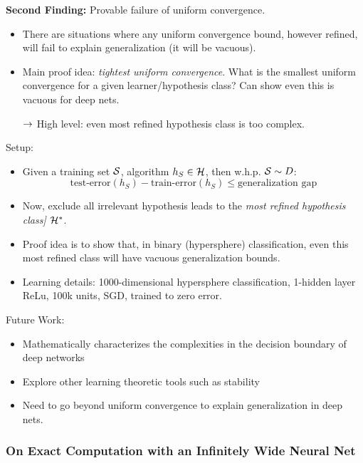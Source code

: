 {\bf Second Finding:} Provable failure of uniform convergence.
\begin{itemize}
    \item There are situations where any uniform convergence bound, however refined, will fail to explain generalization (it will be vacuous).
    \item Main proof idea: {\it tightest uniform convergence}. What is the smallest uniform convergence for a given learner/hypothesis class? Can show even this is vacuous for deep nets.
    
    $\rightarrow$ High level: even most refined hypothesis class is too complex.
\end{itemize}

Setup:
\begin{itemize}
    \item Given a training set $\mathcal{S}$, algorithm $h_S \in \mathcal{H}$, then w.h.p. $\mathcal{S} \sim D$:
    \[
    \text{test-error}(h_S) - \text{train-error}(h_S) \leq \text{generalization gap}
    \]
    
    \item Now, exclude all irrelevant hypothesis leads to the {\it most refined hypothesis class] $\mathcal{H}^*$}.
    
    \item Proof idea is to show that, in binary (hypersphere) classification, even this most refined class will have vacuous generalization bounds.
    
    \item Learning details: 1000-dimensional hypersphere classification, 1-hidden layer ReLu, 100k units, SGD, trained to zero error.
\end{itemize}



Future Work:
\begin{itemize}
    \item Mathematically characterizes the complexities in the decision boundary of deep networks
    \item Explore other learning theoretic tools such as stability
    \item Need to go beyond uniform convergence to explain generalization in deep nets.
\end{itemize}

\spacerule
\subsubsection{On Exact Computation with an Infinitely Wide Neural Net~\cite{arora2019exact}}

